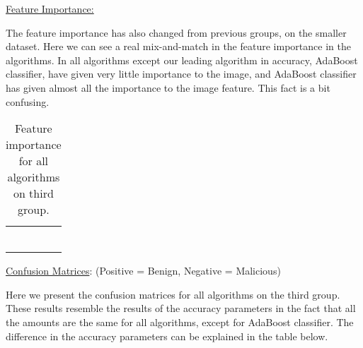 \documentclass{article}
\begin{document}
\noindent\underline{Feature Importance:}

\indent	The feature importance has also changed from previous groups, on the smaller dataset. Here we can see a real mix-and-match in the feature importance in the algorithms. In all algorithms except our leading algorithm in accuracy, AdaBoost classifier, have given very little importance to the image, and AdaBoost classifier has given almost all the importance to the image feature. This fact is a bit confusing.

\clearpage
\newpage

\begin{table}[htb]
\centering
\begin{tabular}{|M{2.5cm}|M{2.5cm}|M{2.5cm}|M{2.5cm}|}
	\hline
	\centering{} &  &  & \tabularnewline
	\hline
	 &  &  & \tabularnewline
	\hline
	 &  &  & \tabularnewline
	\hline
	 &  &  & \tabularnewline
	\hline
	 &  &  & \tabularnewline
	\hline
	 &  &  & \tabularnewline
	\hline
	 &  &  & \tabularnewline
	\hline	
\end{tabular}
\caption{Feature importance for all algorithms on third group.}
\end{table}

\noindent\underline{Confusion Matrices}: (Positive = Benign, Negative = Malicious)

\indent Here we present the confusion matrices for all algorithms on the third group. These results resemble the results of the accuracy parameters in the fact that all the amounts are the same for all algorithms, except for AdaBoost classifier. The difference in the accuracy parameters can be explained in the table below.

\clearpage
\newpage
\end{document}
